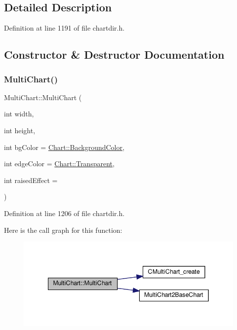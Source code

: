 \subsection{Detailed Description}


Definition at line 1191 of file chartdir.\+h.



\subsection{Constructor \& Destructor Documentation}
\mbox{\label{class_multi_chart_abf2c503949698fbc07de9eab84ac5fdc}} 
\subsubsection{\texorpdfstring{Multi\+Chart()}{MultiChart()}}
{\footnotesize\ttfamily Multi\+Chart\+::\+Multi\+Chart (\begin{DoxyParamCaption}\item[{int}]{width,  }\item[{int}]{height,  }\item[{int}]{bg\+Color = {\ttfamily \hyperlink{namespace_chart_abee0d882fdc9ad0b001245ad9fc64011a134193bde693b9d152d0c6dc59fa7d7f}{Chart\+::\+Background\+Color}},  }\item[{int}]{edge\+Color = {\ttfamily \hyperlink{namespace_chart_abee0d882fdc9ad0b001245ad9fc64011afc6811800a9e2582dac0157b6279f836}{Chart\+::\+Transparent}},  }\item[{int}]{raised\+Effect = {} }\end{DoxyParamCaption})\hspace{0.3cm}{\ttfamily [inline]}}



Definition at line 1206 of file chartdir.\+h.

Here is the call graph for this function\+:
\nopagebreak
\begin{figure}[H]
\begin{center}
\leavevmode
\includegraphics[width=342pt]{class_multi_chart_abf2c503949698fbc07de9eab84ac5fdc_cgraph}
\end{center}
\end{figure}
\mbox{\label{class_multi_chart_a72022b64771bd6dd61f4a69a12262c34}} 
